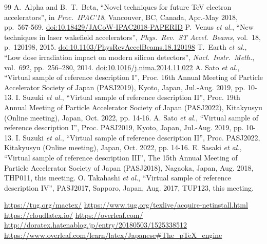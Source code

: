 \documentclass{PASJ2024}
\begin{document}
\begin{thebibliography}{99}
A.~Alpha and B.~T.~Beta, ``Novel techniques for future TeV electron accelerators'',
in \textit{Proc.\ IPAC'18}, 	Vancouver, BC, Canada, Apr.-May 2018,
pp.\ 567-569. %
\url{doi:10.18429/JACoW-IPAC2018-PAPERID}
P.~Venus \emph{et al.},
``New techniques in laser wakefield accelerators'',
\emph{Phys.\ Rev.\ ST Accel.\ Beams}, vol.\ 18,
p.\ 120198, 2015. %
\url{doi:10.1103/PhysRevAccelBeams.18.120198} 
T.~Earth \emph{et al.},
``Low dose irradiation impact on modern silicon detectors'',
\emph{Nucl.\ Instr.\ Meth.}, vol.\ 692, pp.\ 256--280, 2014.
\url{doi:10.1016/j.nima.2014.11.022}
A. Sato \emph{et al.}, ``Virtual sample of reference description I'', Proc. 16th Annual Meeting of Particle Accelerator Society of Japan (PASJ2019), Kyoto, Japan, Jul.-Aug. 2019, pp. 10-13.
I. Suzuki \emph{et al.}, ``Virtual sample of reference description II'', Proc. 19th Annual Meeting of Particle Accelerator Society of Japan (PASJ2022), Kitakyusyu (Online meeting), Japan, Oct. 2022, pp. 14-16.
A. Sato \emph{et al.}, ``Virtual sample of reference description I'', Proc. PASJ2019, Kyoto, Japan, Jul.-Aug. 2019, pp. 10-13.
I. Suzuki \emph{et al.}, ``Virtual sample of reference description II'', Proc. PASJ2022, Kitakyusyu (Online meeting), Japan, Oct. 2022, pp. 14-16.
E. Sasaki \emph{et al.}, ``Virtual sample of reference description III'', The 15th Annual Meeting of Particle Accelerator Society of Japan (PASJ2018), Nagaoka, Japan, Aug. 2018, THP011, this meeting.
O. Takahashi \emph{et al.}, ``Virtual sample of reference description IV'', PASJ2017, Sapporo, Japan, Aug. 2017, TUP123, this meeting.

\url{https://tug.org/mactex/}
\url{https://www.tug.org/texlive/acquire-netinstall.html}
\url{https://cloudlatex.io/}
\url{https://overleaf.com/}
\url{http://doratex.hatenablog.jp/entry/20180503/1525338512}\\
\url{https://www.overleaf.com/learn/latex/Japanese#The_pTeX_engine}
\end{thebibliography}
\end{document}
